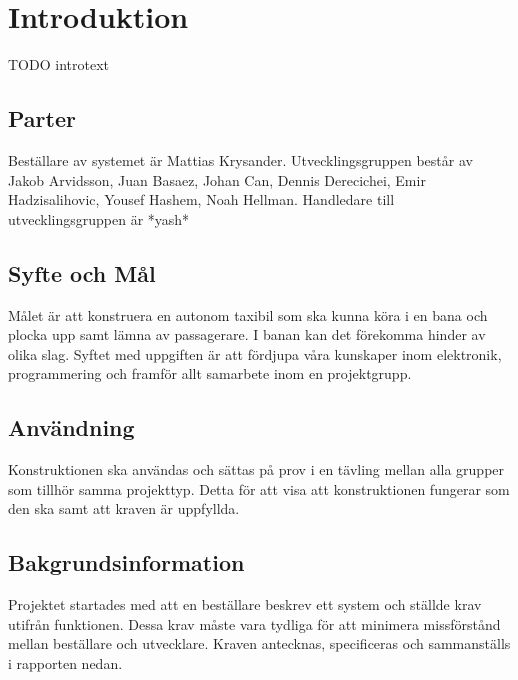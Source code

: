 \documentclass[kravspec/krav.tex]{subfiles}
\begin{document}
\section{Introduktion}
TODO introtext

\subsection{Parter}
Beställare av systemet är Mattias Krysander.  Utvecklingsgruppen består av
Jakob Arvidsson, Juan Basaez, Johan Can, Dennis Derecichei, Emir
Hadzisalihovic, Yousef Hashem, Noah Hellman.  Handledare till
utvecklingsgruppen är *yash*

\subsection{Syfte och Mål}
Målet är att konstruera en autonom taxibil som ska kunna köra i en bana och
plocka upp samt lämna av passagerare. I banan kan det förekomma hinder av olika
slag. Syftet med uppgiften är att fördjupa våra kunskaper inom elektronik,
programmering och framför allt samarbete inom en projektgrupp.

\subsection{Användning}
Konstruktionen ska användas och sättas på prov i en tävling mellan alla grupper som tillhör samma projekttyp. Detta för att visa att konstruktionen fungerar som den ska samt att kraven är uppfyllda.

\subsection{Bakgrundsinformation}
Projektet startades med att en beställare beskrev ett system och ställde krav
utifrån funktionen. Dessa krav måste vara tydliga för att minimera missförstånd
mellan beställare och utvecklare. Kraven antecknas, specificeras och
sammanställs i rapporten nedan.
\end{document}
